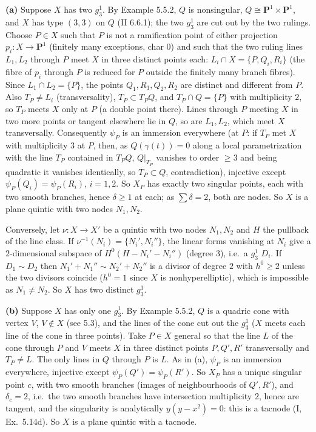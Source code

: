 \documentclass[11pt]{article}
\begin{document}
\textbf{(a)} Suppose $X$ has two $g^1_3$. By Example 5.5.2, $Q$ is nonsingular, $Q\cong\mathbf P^1\times\mathbf P^1$, and $X$ has type $(3,3)$ on $Q$ (II 6.6.1); the two $g^1_3$ are cut out by the two rulings. Choose $P\in X$ such that $P$ is not a ramification point of either projection $p_i:X\to\mathbf P^1$ (finitely many exceptions, char $0$) and such that the two ruling lines $L_1,L_2$ through $P$ meet $X$ in three distinct points each: $L_i\cap X=\{P,Q_i,R_i\}$ (the fibre of $p_i$ through $P$ is reduced for $P$ outside the finitely many branch fibres). Since $L_1\cap L_2=\{P\}$, the points $Q_1,R_1,Q_2,R_2$ are distinct and different from $P$. Also $T_P\ne L_i$ (transversality), $T_P\subset T_PQ$, and $T_P\cap Q=\{P\}$ with multiplicity $2$, so $T_P$ meets $X$ only at $P$ (a double point there). Lines through $P$ meeting $X$ in two more points or tangent elsewhere lie in $Q$, so are $L_1,L_2$, which meet $X$ transversally. Consequently $\psi_P$ is an immersion everywhere (at $P$: if $T_P$ met $X$ with multiplicity $3$ at $P$, then, as $Q(\gamma(t))=0$ along a local parametrization with the line $T_P$ contained in $T_PQ$, $Q|_{T_P}$ vanishes to order $\ge3$ and being quadratic it vanishes identically, so $T_P\subset Q$, contradiction), injective except $\psi_P(Q_i)=\psi_P(R_i)$, $i=1,2$. So $X_P$ has exactly two singular points, each with two smooth branches, hence $\delta\ge1$ at each; as $\sum\delta=2$, both are nodes. So $X$ is a plane quintic with two nodes $N_1,N_2$.

Conversely, let $\nu:X\to X'$ be a quintic with two nodes $N_1,N_2$ and $H$ the pullback of the line class. If $\nu^{-1}(N_i)=\{N_i',N_i''\}$, the linear forms vanishing at $N_i$ give a $2$-dimensional subspace of $H^0(H-N_i'-N_i'')$ (degree $3$), i.e.\ a $g^1_3$ $D_i$. If $D_1\sim D_2$ then $N_1'+N_1''\sim N_2'+N_2''$ is a divisor of degree $2$ with $h^0\ge2$ unless the two divisors coincide ($h^0=1$ since $X$ is nonhyperelliptic), which is impossible as $N_1\ne N_2$. So $X$ has two distinct $g^1_3$.

\textbf{(b)} Suppose $X$ has only one $g^1_3$. By Example 5.5.2, $Q$ is a quadric cone with vertex $V$, $V\notin X$ (see 5.3), and the lines of the cone cut out the $g^1_3$ ($X$ meets each line of the cone in three points). Take $P\in X$ general so that the line $L$ of the cone through $P$ and $V$ meets $X$ in three distinct points $P,Q',R'$ transversally and $T_P\ne L$. The only lines in $Q$ through $P$ is $L$. As in (a), $\psi_P$ is an immersion everywhere, injective except $\psi_P(Q')=\psi_P(R')$. So $X_P$ has a unique singular point $c$, with two smooth branches (images of neighbourhoods of $Q',R'$), and $\delta_c=2$, i.e.\ the two smooth branches have intersection multiplicity $2$, hence are tangent, and the singularity is analytically $y(y-x^2)=0$: this is a tacnode (I, Ex.~5.14d). So $X$ is a plane quintic with a tacnode.
\end{document}

